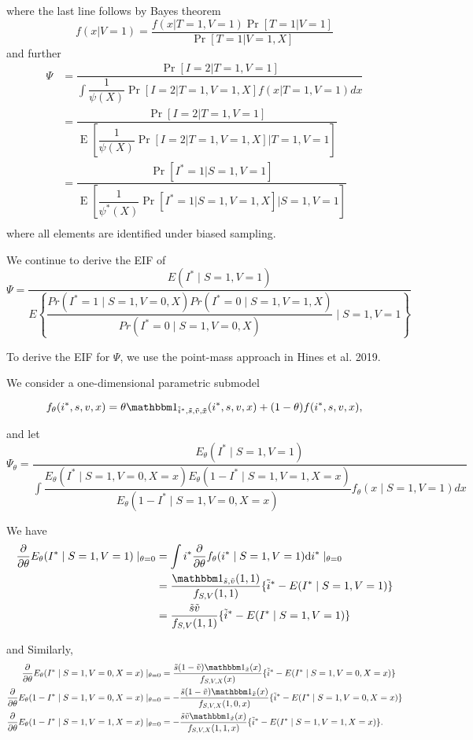 \documentclass{article}
\DeclareMathOperator{\E}{E}
\begin{document}
where the last line follows by Bayes theorem 
\begin{equation*}
    f(x | V = 1) = \dfrac{f(x | T = 1, V = 1)\Pr[T = 1 | V = 1]}{\Pr[T = 1 | V = 1, X]}
\end{equation*}
and further
\begin{align*}
    \Psi &= \dfrac{\Pr[I = 2 | T = 1, V = 1]}{\int \dfrac{1}{\psi(X)} \Pr[I = 2 | T = 1, V = 1, X] f(x | T = 1, V = 1) dx} \\
    &= \dfrac{\Pr[I = 2 | T = 1, V = 1]}{\E\left[\dfrac{1}{\psi(X)} \Pr[I = 2 | T = 1, V = 1, X] \bigg| T = 1, V = 1\right]} \\
    &= \dfrac{\Pr[I^* = 1 | S = 1, V = 1]}{\E\left[\dfrac{1}{\psi^*(X)} \Pr[I^* = 1 | S = 1, V = 1, X] \bigg| S = 1, V = 1\right]} \\
\end{align*}
where all elements are identified under biased sampling.


We continue to derive the EIF of
$$\Psi = \dfrac{E(I^*\mid S=1, V=1)}{E\left\{\dfrac{Pr(I^*=1\mid S=1, V=0, X)Pr(I^*=0\mid S=1, V=1, X)}{Pr(I^*=0\mid S=1, V=0, X)}\mid S=1, V=1\right\}}$$

To derive the EIF for $\Psi$, we use the point-mass approach in Hines et al. 2019.


We consider a one-dimensional parametric submodel

$$f_\theta(i^*, s, v, x)=\theta \mathbbm 1_{\tilde i^*, \tilde s, \tilde v, \tilde x}(i^*, s, v, x) + (1-\theta)f(i^*, s, v,x),$$

and let
$$\Psi_\theta = \dfrac{E_\theta(I^*\mid S=1, V=1)}{\int \dfrac{E_\theta(I^*\mid S=1, V=0, X=x)E_\theta(1-I^*\mid S=1, V=1, X=x)}{E_\theta(1-I^*\mid S=1, V=0, X=x)}f_\theta(x\mid S=1, V=1)dx}$$


We have
\begin{align*}
    \dfrac{\partial}{\partial\theta}E_\theta(I^*\mid S=1, V=1)\mid_{\theta=0} &= \int i^* \dfrac{\partial}{\partial\theta}f_\theta(i^*\mid S=1, V=1)\mathrm d i^*\mid_{\theta = 0}\\
    &= \dfrac{\mathbbm 1_{\tilde s,\tilde v}(1, 1)}{f_{S, V}(1, 1)}\{\tilde i^* - E(I^*\mid S=1, V=1)\}\\
    &= \dfrac{\tilde s\tilde v}{f_{S, V}(1, 1)}\{\tilde i^* - E(I^*\mid S=1, V=1)\}
\end{align*}

and Similarly,
\begin{align*}
    \dfrac{\partial}{\partial\theta}E_\theta(I^*\mid S=1, V=0, X=x)\mid_{\theta=0} &= \dfrac{\tilde s(1-\tilde v)\mathbbm 1_{\tilde x}(x)}{f_{S, V, X}(x)}\{\tilde i^* - E(I^*\mid S=1, V=0, X=x)\}\\
     \dfrac{\partial}{\partial\theta}E_\theta(1-I^*\mid S=1, V=0, X=x)\mid_{\theta=0} &= -\dfrac{\tilde s(1-\tilde v)\mathbbm 1_{\tilde x}(x)}{f_{S, V, X}(1, 0, x)}\{\tilde i^* - E(I^*\mid S=1, V=0, X=x)\}\\
     \dfrac{\partial}{\partial\theta}E_\theta(1-I^*\mid S=1, V=1, X=x)\mid_{\theta=0} &= -\dfrac{\tilde s\tilde v\mathbbm 1_{\tilde x}(x)}{f_{S, V, X}(1, 1, x)}\{\tilde i^* - E(I^*\mid S=1, V=1, X=x)\}.
\end{align*}
\end{document}
